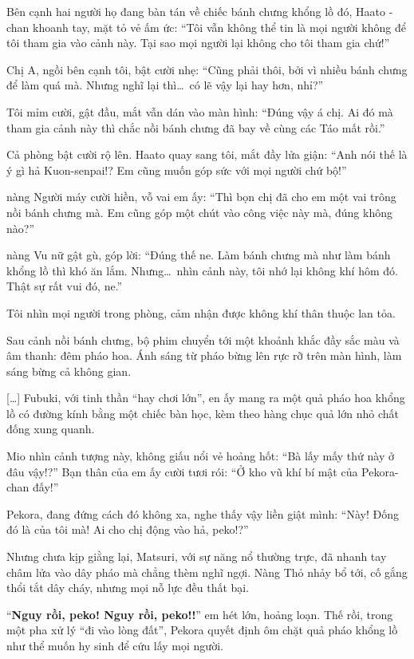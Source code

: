 \documentclass[../main.tex]{subfiles}
\begin{document}
Bên cạnh hai người họ đang bàn tán về chiếc bánh chưng khổng lồ đó, Haato -chan khoanh tay, mặt tỏ vẻ ấm ức: ``Tôi vẫn không thể tin là mọi người không để tôi tham gia vào cảnh này. Tại sao mọi người lại không cho tôi tham gia chứ!''

Chị A, ngồi bên cạnh tôi, bật cười nhẹ: ``Cũng phải thôi, bởi vì nhiều bánh chưng để làm quá mà. Nhưng nghĩ lại thì\dots\ có lẽ vậy lại hay hơn, nhỉ?''

Tôi mỉm cười, gật đầu, mắt vẫn dán vào màn hình: ``Đúng vậy á chị. Ai đó mà tham gia cảnh này thì chắc nồi bánh chưng đã bay về cùng các Táo mất rồi.''

Cả phòng bật cười rộ lên. Haato quay sang tôi, mắt đầy lửa giận: ``Anh nói thế là ý gì hả Kuon-senpai!? Em cũng muốn góp sức với mọi người chứ bộ!''

nàng Người máy cười hiền, vỗ vai em ấy: ``Thì bọn chị đã cho em một vai trông nồi bánh chưng mà. Em cũng góp một chút vào công việc này mà, đúng không nào?''

nàng Vu nữ gật gù, góp lời: ``Đúng thế ne. Làm bánh chưng mà như làm bánh khổng lồ thì khó ăn lắm. Nhưng\dots\ nhìn cảnh này, tôi nhớ lại không khí hôm đó. Thật sự rất vui đó, ne.''

Tôi nhìn mọi người trong phòng, cảm nhận được không khí thân thuộc lan tỏa.

Sau cảnh nồi bánh chưng, bộ phim chuyển tới một khoảnh khắc đầy sắc màu và âm thanh: đêm pháo hoa. Ánh sáng từ pháo bừng lên rực rỡ trên màn hình, làm sáng bừng cả không gian.

\il

[\dots] Fubuki, với tinh thần ``hay chơi lớn'', en ấy mang ra một quả pháo hoa khổng lồ có đường kính bằng một chiếc bàn học, kèm theo hàng chục quả lớn nhỏ chất đống xung quanh.

Mio nhìn cảnh tượng này, không giấu nổi vẻ hoảng hốt: ``Bà lấy mấy thứ này ở đâu vậy!?'' Bạn thân của em ấy cười tươi rói: ``Ở kho vũ khí bí mật của Pekora-chan đấy!''

Pekora, đang đứng cách đó không xa, nghe thấy vậy liền giật mình: ``Này! Đống đó là của tôi mà! Ai cho chị động vào hả, peko!?''

Nhưng chưa kịp giằng lại, Matsuri, với sự năng nổ thường trực, đã nhanh tay châm lửa vào dây pháo mà chẳng thèm nghĩ ngợi. Nàng Thỏ nhảy bổ tới, cố gắng thổi tắt dây cháy, nhưng mọi nỗ lực đều thất bại.

``\textbf{Nguy rồi, peko! Nguy rồi, peko!!}'' em hét lớn, hoảng loạn. Thế rồi, trong một pha xử lý ``đi vào lòng đất'', Pekora quyết định ôm chặt quả pháo khổng lồ như thể muốn hy sinh để cứu lấy mọi người.
\end{document}
